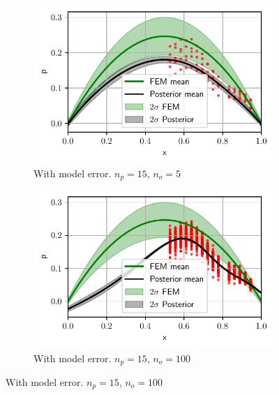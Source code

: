 \documentclass[%
  a4paper,oneside,%
  11pt,%
  smallchapters,
  style=printdev,
  extramargin,
  green,%
  rgb, <cmyk>
  ]{tubsbook}
\begin{document}
\begin{figure}[!ht]

	\begin{subfigure}[t]{.5\textwidth}
	\centering
	\includegraphics[width=1\linewidth]{../../Python/Results/1D/HalfSide/Model_Error/5o_15s/Result.pdf}
	\caption{With model error. $n_p=15$, $n_o=5$}
		\label{fig:1DOneSideda}
	\end{subfigure}%
	\begin{subfigure}[t]{.5\textwidth}
	\centering
	\includegraphics[width=1\linewidth]{../../Python/Results/1D/HalfSide/Model_Error/100o_15s/Result.pdf}
\centering
\caption{With model error. $n_p=15$, $n_o=100$ }
\label{fig:1DOneSidedb}
	\end{subfigure}
	

\end{figure}
\end{document}
